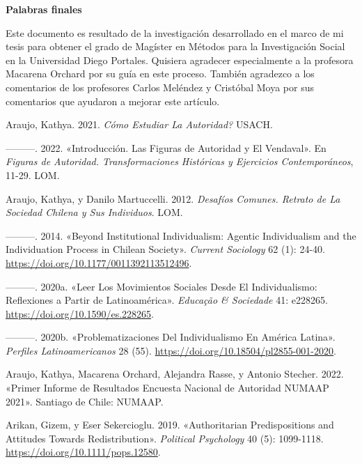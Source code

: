 \documentclass[
  letterpaper,
  DIV=11,
  numbers=noendperiod]{scrartcl}
\newlength{\cslhangindent}
\newenvironment{CSLReferences}[2] %
 {\begin{list}{}{%
  \setlength{\itemindent}{0pt}
  \setlength{\leftmargin}{0pt}
  \setlength{\parsep}{0pt}
  \ifodd #1
   \setlength{\leftmargin}{\cslhangindent}
   \setlength{\itemindent}{-1\cslhangindent}
  \fi
  \setlength{\itemsep}{#2\baselineskip}}}
 {\end{list}}
\begin{document}
\textbf{Palabras finales}

Este documento es resultado de la investigación desarrollado en el marco
de mi tesis para obtener el grado de Magíster en Métodos para la
Investigación Social en la Universidad Diego Portales. Quisiera
agradecer especialmente a la profesora Macarena Orchard por su guía en
este proceso. También agradezco a los comentarios de los profesores
Carlos Meléndez y Cristóbal Moya por sus comentarios que ayudaron a
mejorar este artículo.

\label{refs}
\begin{CSLReferences}{1}{0}
Araujo, Kathya. 2021. \emph{{\textquestiondown}{C{ó}mo Estudiar} La
Autoridad?} USACH.

---------. 2022. {«Introducci{ó}n. {Las} Figuras de Autoridad y El
Vendaval»}. En \emph{Figuras de Autoridad. {Transformaciones}
Hist{ó}ricas y Ejercicios Contempor{á}neos}, 11-29. LOM.

Araujo, Kathya, y Danilo Martuccelli. 2012. \emph{Desaf{í}os {Comunes}.
{Retrato} de La Sociedad Chilena y Sus Individuos}. LOM.

---------. 2014. {«Beyond Institutional Individualism: {Agentic}
Individualism and the Individuation Process in {Chilean} Society»}.
\emph{Current Sociology} 62 (1): 24-40.
\url{https://doi.org/10.1177/0011392113512496}.

---------. 2020a. {«Leer Los Movimientos Sociales Desde El
Individualismo: {Reflexiones} a Partir de {Latinoam{é}rica}»}.
\emph{Educa{ç}{ã}o \& Sociedade} 41: e228265.
\url{https://doi.org/10.1590/es.228265}.

---------. 2020b. {«Problematizaciones Del Individualismo En {Am{é}rica
Latina}»}. \emph{Perfiles Latinoamericanos} 28 (55).
\url{https://doi.org/10.18504/pl2855-001-2020}.

Araujo, Kathya, Macarena Orchard, Alejandra Rasse, y Antonio Stecher.
2022. {«Primer {Informe} de {Resultados Encuesta Nacional} de {Autoridad
NUMAAP} 2021»}. Santiago de Chile: NUMAAP.

Arikan, Gizem, y Eser Sekercioglu. 2019. {«Authoritarian
{Predispositions} and {Attitudes Towards Redistribution}»}.
\emph{Political Psychology} 40 (5): 1099-1118.
\url{https://doi.org/10.1111/pops.12580}.


\end{CSLReferences}
\end{document}
